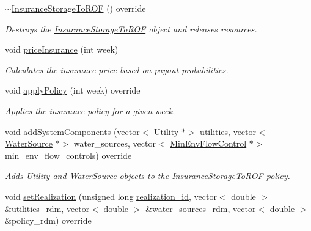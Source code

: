 \begin{DoxyCompactItemize}
\mbox{\hyperlink{classInsuranceStorageToROF_aba2143897e3ec32d698d25a1aa572a73}{$\sim$\+Insurance\+Storage\+To\+R\+OF}} () override
\begin{DoxyCompactList}\small\item\em Destroys the \mbox{\hyperlink{classInsuranceStorageToROF}{Insurance\+Storage\+To\+R\+OF}} object and releases resources. \end{DoxyCompactList}\item 
void \mbox{\hyperlink{classInsuranceStorageToROF_a2519f93b9db551105d9a7913d0db9540}{price\+Insurance}} (int week)
\begin{DoxyCompactList}\small\item\em Calculates the insurance price based on payout probabilities. \end{DoxyCompactList}\item 
void \mbox{\hyperlink{classInsuranceStorageToROF_a17aa84e0559793b3c463c468dfda3753}{apply\+Policy}} (int week) override
\begin{DoxyCompactList}\small\item\em Applies the insurance policy for a given week. \end{DoxyCompactList}\item 
void \mbox{\hyperlink{classInsuranceStorageToROF_ac7d317a7f189739275960e4f021108d8}{add\+System\+Components}} (vector$<$ \mbox{\hyperlink{classUtility}{Utility}} $\ast$$>$ utilities, vector$<$ \mbox{\hyperlink{classWaterSource}{Water\+Source}} $\ast$$>$ water\+\_\+sources, vector$<$ \mbox{\hyperlink{classMinEnvFlowControl}{Min\+Env\+Flow\+Control}} $\ast$$>$ \mbox{\hyperlink{classContinuityModel_afc991e5c0d144020e49a97751a04b302}{min\+\_\+env\+\_\+flow\+\_\+controls}}) override
\begin{DoxyCompactList}\small\item\em Adds \mbox{\hyperlink{classUtility}{Utility}} and \mbox{\hyperlink{classWaterSource}{Water\+Source}} objects to the \mbox{\hyperlink{classInsuranceStorageToROF}{Insurance\+Storage\+To\+R\+OF}} policy. \end{DoxyCompactList}\item 
void \mbox{\hyperlink{classInsuranceStorageToROF_a6318c3dca8b0c4d568eac494e5ccf712}{set\+Realization}} (unsigned long \mbox{\hyperlink{classContinuityModel_a7b6c99bf256f6c6b633ebb78282f43c7}{realization\+\_\+id}}, vector$<$ double $>$ \&\mbox{\hyperlink{classContinuityModel_aa4a00b76da6295d2faa11e3dcaea1896}{utilities\+\_\+rdm}}, vector$<$ double $>$ \&\mbox{\hyperlink{classContinuityModel_ab7b8fa93a6f56b328e425e1ead6cfefa}{water\+\_\+sources\+\_\+rdm}}, vector$<$ double $>$ \&policy\+\_\+rdm) override
$$
\end{DoxyCompactItemize}
